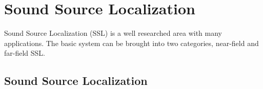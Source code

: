 \chapter{Sound Source Localization}
Sound Source Localization (SSL)  is a well researched area with many applications.
The basic system can be brought into two categories, near-field and 
far-field SSL.


\section{Sound Source Localization}